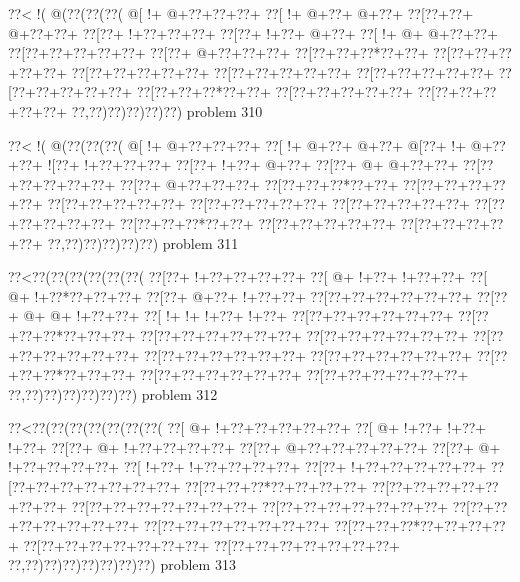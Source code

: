 \vbox{\vbox{\goo
\0??<\- !(\- @(\0??(\0??(\0??(
\- @[\- !+\- @+\0??+\0??+\0??+
\0??[\- !+\- @+\0??+\- @+\0??+
\0??[\0??+\0??+\- @+\0??+\0??+
\0??[\0??+\- !+\0??+\0??+\0??+
\0??[\0??+\- !+\0??+\- @+\0??+
\0??[\- !+\- @+\- @+\0??+\0??+
\0??[\0??+\0??+\0??+\0??+\0??+
\0??[\0??+\- @+\0??+\0??+\0??+
\0??[\0??+\0??+\0??*\0??+\0??+
\0??[\0??+\0??+\0??+\0??+\0??+
\0??[\0??+\0??+\0??+\0??+\0??+
\0??[\0??+\0??+\0??+\0??+\0??+
\0??[\0??+\0??+\0??+\0??+\0??+
\0??[\0??+\0??+\0??+\0??+\0??+
\0??[\0??+\0??+\0??*\0??+\0??+
\0??[\0??+\0??+\0??+\0??+\0??+
\0??[\0??+\0??+\0??+\0??+\0??+
\0??,\0??)\0??)\0??)\0??)\0??)
}
\hfil problem 310\hfil\break
}

\vbox{\vbox{\goo
\0??<\- !(\- @(\0??(\0??(\0??(
\- @[\- !+\- @+\0??+\0??+\0??+
\0??[\- !+\- @+\0??+\- @+\0??+
\- @[\0??+\- !+\- @+\0??+\0??+
\- ![\0??+\- !+\0??+\0??+\0??+
\0??[\0??+\- !+\0??+\- @+\0??+
\0??[\0??+\- @+\- @+\0??+\0??+
\0??[\0??+\0??+\0??+\0??+\0??+
\0??[\0??+\- @+\0??+\0??+\0??+
\0??[\0??+\0??+\0??*\0??+\0??+
\0??[\0??+\0??+\0??+\0??+\0??+
\0??[\0??+\0??+\0??+\0??+\0??+
\0??[\0??+\0??+\0??+\0??+\0??+
\0??[\0??+\0??+\0??+\0??+\0??+
\0??[\0??+\0??+\0??+\0??+\0??+
\0??[\0??+\0??+\0??*\0??+\0??+
\0??[\0??+\0??+\0??+\0??+\0??+
\0??[\0??+\0??+\0??+\0??+\0??+
\0??,\0??)\0??)\0??)\0??)\0??)
}
\hfil problem 311\hfil\break
}

\vbox{\vbox{\goo
\0??<\0??(\0??(\0??(\0??(\0??(\0??(
\0??[\0??+\- !+\0??+\0??+\0??+\0??+
\0??[\- @+\- !+\0??+\- !+\0??+\0??+
\0??[\- @+\- !+\0??*\0??+\0??+\0??+
\0??[\0??+\- @+\0??+\- !+\0??+\0??+
\0??[\0??+\0??+\0??+\0??+\0??+\0??+
\0??[\0??+\- @+\- @+\- !+\0??+\0??+
\0??[\- !+\- !+\- !+\0??+\- !+\0??+
\0??[\0??+\0??+\0??+\0??+\0??+\0??+
\0??[\0??+\0??+\0??*\0??+\0??+\0??+
\0??[\0??+\0??+\0??+\0??+\0??+\0??+
\0??[\0??+\0??+\0??+\0??+\0??+\0??+
\0??[\0??+\0??+\0??+\0??+\0??+\0??+
\0??[\0??+\0??+\0??+\0??+\0??+\0??+
\0??[\0??+\0??+\0??+\0??+\0??+\0??+
\0??[\0??+\0??+\0??*\0??+\0??+\0??+
\0??[\0??+\0??+\0??+\0??+\0??+\0??+
\0??[\0??+\0??+\0??+\0??+\0??+\0??+
\0??,\0??)\0??)\0??)\0??)\0??)\0??)
}
\hfil problem 312\hfil\break
}

\vbox{\vbox{\goo
\0??<\0??(\0??(\0??(\0??(\0??(\0??(\0??(
\0??[\- @+\- !+\0??+\0??+\0??+\0??+\0??+
\0??[\- @+\- !+\0??+\- !+\0??+\- !+\0??+
\0??[\0??+\- @+\- !+\0??+\0??+\0??+\0??+
\0??[\0??+\- @+\0??+\0??+\0??+\0??+\0??+
\0??[\0??+\- @+\- !+\0??+\0??+\0??+\0??+
\0??[\- !+\0??+\- !+\0??+\0??+\0??+\0??+
\0??[\0??+\- !+\0??+\0??+\0??+\0??+\0??+
\0??[\0??+\0??+\0??+\0??+\0??+\0??+\0??+
\0??[\0??+\0??+\0??*\0??+\0??+\0??+\0??+
\0??[\0??+\0??+\0??+\0??+\0??+\0??+\0??+
\0??[\0??+\0??+\0??+\0??+\0??+\0??+\0??+
\0??[\0??+\0??+\0??+\0??+\0??+\0??+\0??+
\0??[\0??+\0??+\0??+\0??+\0??+\0??+\0??+
\0??[\0??+\0??+\0??+\0??+\0??+\0??+\0??+
\0??[\0??+\0??+\0??*\0??+\0??+\0??+\0??+
\0??[\0??+\0??+\0??+\0??+\0??+\0??+\0??+
\0??[\0??+\0??+\0??+\0??+\0??+\0??+\0??+
\0??,\0??)\0??)\0??)\0??)\0??)\0??)\0??)
}
\hfil problem 313\hfil\break
}

